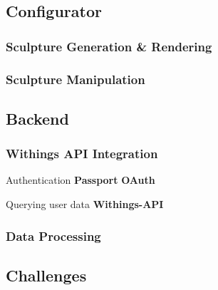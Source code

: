 \documentclass[../medieninformatik-arbeit.tex]{subfiles}
\begin{document}
\subsection{Configurator}
\subsubsection{Sculpture Generation \& Rendering}


\subsubsection{Sculpture Manipulation}

\label{sub:sculpturegeneration}
\subsection{Backend}
\subsubsection{Withings API Integration}
\label{sub:ApiIntegration}

Authentication 
\textbf{Passport}\cite{passport} 
\textbf{OAuth} \cite{hammer2010oauth}

Querying user data
\textbf{Withings-API}\cite{withingsApi} 



\subsubsection{Data Processing}
\subsection{Challenges}
\end{document}
